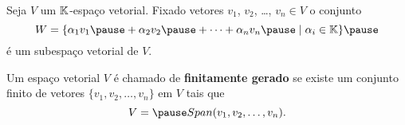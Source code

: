 \documentclass{beamer}
\begin{document}
\begin{frame}
	\begin{proposicao}
		Seja $V$ um $\mathbb{K}$-espaço vetorial. \pause Fixado vetores $v_1$, $v_2$, \dots, $v_n \in V$ \pause o conjunto
		\[
			W = \{\alpha_1v_1 \pause + \alpha_2v_2 \pause + \cdots + \alpha_nv_n \pause \mid \alpha_i \in \cp{K}\}\pause
		\]
		é um subespaço vetorial de $V$.
	\end{proposicao}
\end{frame}

\begin{frame}
	\begin{definicao}
		Um espaço vetorial $V$ é chamado de \textbf{finitamente gerado} \pause se existe um conjunto finito \pause de vetores $\{v_1, v_2, \dots, v_n\}$ em $V$ \pause tais que\pause
		\[
			V = \pause Span(v_1, v_2, \dots, v_n).
		\]
	\end{definicao}
\end{frame}
\end{document}
